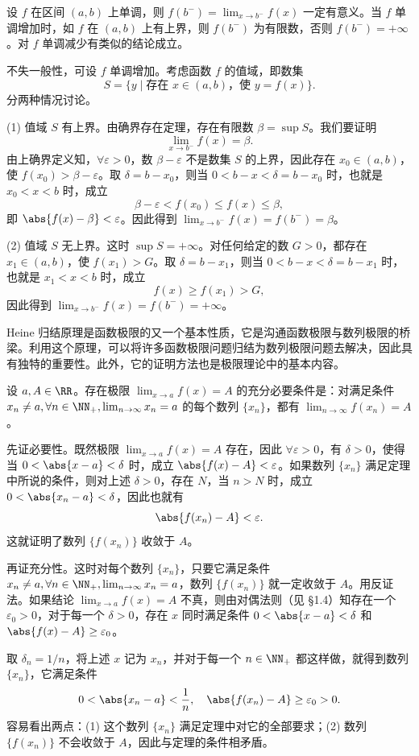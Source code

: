 \begin{xproposition}[4.2.2（单调函数的单侧极限存在定理）]
设 $f$ 在区间 $(a,b)$ 上单调，则 $f(b^-)=\lim_{x\to b^-}f(x)$ 一定有意义。当 $f$ 单调增加时，如 $f$ 在 $(a,b)$ 上有上界，则 $f(b^-)$ 为有限数，否则 $f(b^-)=+\infty$。对 $f$ 单调减少有类似的结论成立。
\end{xproposition}
\begin{xproof}
不失一般性，可设 $f$ 单调增加。考虑函数 $f$ 的值域，即数集
\[
  S=\{y\mid\text{存在 }x\in(a,b)\text{，使 }y=f(x)\}.
\]
分两种情况讨论。

(1) 值域 $S$ 有上界。由确界存在定理，存在有限数 $\beta=\sup S$。我们要证明
\[
  \lim_{x\to b^-}f(x)=\beta.
\]
由上确界定义知，$\forall\varepsilon>0$，数 $\beta-\varepsilon$ 不是数集 $S$ 的上界，因此存在 $x_0\in(a,b)$，使 $f(x_0)>\beta-\varepsilon$。取 $\delta=b-x_0$，则当 $0<b-x<\delta=b-x_0$ 时，也就是 $x_0<x<b$ 时，成立
\[
  \beta-\varepsilon<f(x_0)\leq f(x)\leq\beta,
\]
即 $\abs{f(x)-\beta}<\varepsilon$。因此得到 $\lim_{x\to b^-}f(x)=f(b^-)=\beta$。

(2) 值域 $S$ 无上界。这时 $\sup S=+\infty$。对任何给定的数 $G>0$，都存在 $x_1\in(a,b)$，使 $f(x_1)>G$。取 $\delta=b-x_1$，则当 $0<b-x<\delta=b-x_1$ 时，也就是 $x_1<x<b$ 时，成立
\[
  f(x)\geq f(x_1)>G,
\]
因此得到 $\lim_{x\to b^-}f(x)=f(b^-)=+\infty$。
\end{xproof}

Heine 归结原理是函数极限的又一个基本性质，它是沟通函数极限与数列极限的桥梁。利用这个原理，可以将许多函数极限问题归结为数列极限问题去解决，因此具有独特的重要性。此外，它的证明方法也是极限理论中的基本内容。

\begin{xproposition}
设 $a,A\in\RR$。存在极限 $\lim_{x\to a}f(x)=A$ 的充分必要条件是：对满足条件 $x_n\ne a,\forall n\in\NN_+,\lim_{n\to\infty}x_n=a$ 的每个数列 $\{x_n\}$，都有 $\lim_{n\to\infty}f(x_n)=A$。
\end{xproposition}
\begin{xproof}
先证必要性。既然极限 $\lim_{x\to a}f(x)=A$ 存在，因此 $\forall\varepsilon>0$，有 $\delta>0$，使得当 $0<\abs{x-a}<\delta$ 时，成立 $\abs{f(x)-A}<\varepsilon$。如果数列 $\{x_n\}$ 满足定理中所说的条件，则对上述 $\delta>0$，存在 $N$，当 $n>N$ 时，成立 $0<\abs{x_n-a}<\delta$，因此也就有
\[
  \abs{f(x_n)-A}<\varepsilon.
\]
这就证明了数列 $\{f(x_n)\}$ 收敛于 $A$。

再证充分性。这时对每个数列 $\{x_n\}$，只要它满足条件 $x_n\ne a,\forall n\in\NN_+,\lim_{n\to\infty}x_n=a$，数列 $\{f(x_n)\}$ 就一定收敛于 $A$。用反证法。如果结论 $\lim_{x\to a}f(x)=A$ 不真，则由对偶法则（见 §1.4）知存在一个 $\varepsilon_0>0$，对于每一个 $\delta>0$，存在 $x$ 同时满足条件 $0<\abs{x-a}<\delta$ 和 $\abs{f(x)-A}\geq\varepsilon_0$。

取 $\delta_n=1/n$，将上述 $x$ 记为 $x_n$，并对于每一个 $n\in\NN_+$ 都这样做，就得到数列 $\{x_n\}$，它满足条件
\[
  0<\abs{x_n-a}<\frac1n,\quad \abs{f(x_n)-A}\geq\varepsilon_0>0.
\]
容易看出两点：(1) 这个数列 $\{x_n\}$ 满足定理中对它的全部要求；(2) 数列 $\{f(x_n)\}$ 不会收敛于 $A$，因此与定理的条件相矛盾。
\end{xproof}

